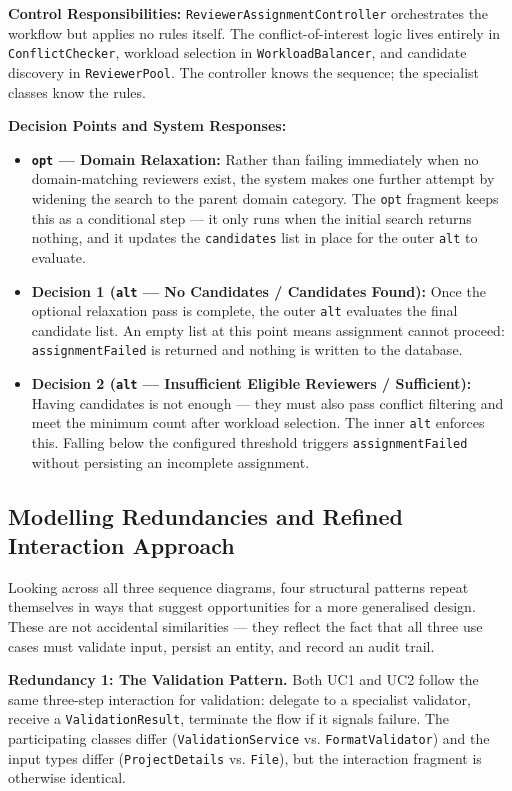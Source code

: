 \documentclass[12pt,a4paper]{article}
\newcommand{\code}[1]{\texttt{\small #1}}
\begin{document}
\noindent\textbf{Control Responsibilities:} \code{ReviewerAssignmentController} orchestrates the workflow but applies no rules itself. The conflict-of-interest logic lives entirely in \code{ConflictChecker}, workload selection in \code{WorkloadBalancer}, and candidate discovery in \code{ReviewerPool}. The controller knows the sequence; the specialist classes know the rules.

\noindent\textbf{Decision Points and System Responses:}
\begin{itemize}
  \item \textbf{\code{opt} --- Domain Relaxation:} Rather than failing immediately when no domain-matching reviewers exist, the system makes one further attempt by widening the search to the parent domain category. The \code{opt} fragment keeps this as a conditional step --- it only runs when the initial search returns nothing, and it updates the \code{candidates} list in place for the outer \code{alt} to evaluate.
  \item \textbf{Decision 1 (\code{alt} --- No Candidates / Candidates Found):} Once the optional relaxation pass is complete, the outer \code{alt} evaluates the final candidate list. An empty list at this point means assignment cannot proceed: \code{assignmentFailed} is returned and nothing is written to the database.
  \item \textbf{Decision 2 (\code{alt} --- Insufficient Eligible Reviewers / Sufficient):} Having candidates is not enough --- they must also pass conflict filtering and meet the minimum count after workload selection. The inner \code{alt} enforces this. Falling below the configured threshold triggers \code{assignmentFailed} without persisting an incomplete assignment.
\end{itemize}

\subsection{Modelling Redundancies and Refined Interaction Approach}

Looking across all three sequence diagrams, four structural patterns repeat themselves in ways that suggest opportunities for a more generalised design. These are not accidental similarities --- they reflect the fact that all three use cases must validate input, persist an entity, and record an audit trail.

\noindent\textbf{Redundancy 1: The Validation Pattern.}
Both UC1 and UC2 follow the same three-step interaction for validation: delegate to a specialist validator, receive a \code{ValidationResult}, terminate the flow if it signals failure. The participating classes differ (\code{ValidationService} vs. \code{FormatValidator}) and the input types differ (\code{ProjectDetails} vs. \code{File}), but the interaction fragment is otherwise identical.
\end{document}
